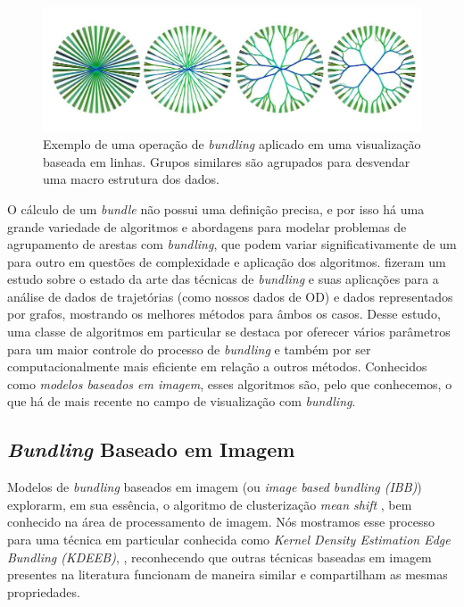 \begin{figure}[!htb]
  \centering
  \includegraphics[width=1\textwidth]{../figuras/bundling.jpeg}
  \caption[Exemplo de uma operação de \emph{bundling} aplicado em uma visualização baseada em linhas]{
  Exemplo de uma operação de \emph{bundling} aplicado em uma visualização baseada em linhas. Grupos similares
  são agrupados para desvendar uma macro estrutura dos dados.}
  \label{fig:bundling-ex}
\end{figure}

O cálculo de um \emph{bundle} não possui uma definição precisa, e por isso há
uma grande variedade de algoritmos e abordagens para modelar problemas de
agrupamento de arestas com \emph{bundling}, que podem variar significativamente
de um para outro em questões de complexidade e aplicação dos algoritmos.
\citet{Lhuillier2017} fizeram um estudo sobre o estado da arte das técnicas de
\emph{bundling} e suas aplicações para a análise de dados de trajetórias (como
nossos dados de OD) e dados representados por grafos, mostrando os melhores
métodos para âmbos os casos. Desse estudo, uma classe de algoritmos em particular
se destaca por oferecer vários parâmetros para um maior controle do processo de \emph{bundling}
e também por ser computacionalmente mais eficiente em relação a outros métodos. Conhecidos
como \emph{modelos baseados em imagem}, esses algoritmos são, pelo que conhecemos,
o que há de mais recente no campo de visualização com \emph{bundling}.

\subsection{\emph{Bundling} Baseado em Imagem}
\label{sec:modelo-imagem}

Modelos de \emph{bundling} baseados em imagem (ou \emph{image based bundling
(IBB)}) explorarm, em sua essência, o algoritmo de clusterização \emph{mean
shift} \citep{comaniciu02}, bem conhecido na área de processamento de imagem.
Nós mostramos esse processo para uma técnica em particular conhecida como
\emph{Kernel Density Estimation Edge Bundling (KDEEB)}, \citep{hurter:12},
reconhecendo que outras técnicas baseadas em imagem presentes na literatura
funcionam de maneira similar e compartilham as mesmas propriedades.

